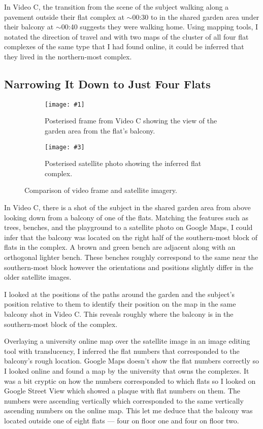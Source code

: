 \documentclass[a4paper,11pt]{report}
\newcommand{\comparison}[5] {
    \begin{figure}[htbp]
        \centering
        
        \begin{subfigure}[t]{0.45\textwidth}
            \centering
            \texttt{[image: \#1]}
            \caption{#2}
        \end{subfigure}
        \hfill
        \begin{subfigure}[t]{0.45\textwidth}
            \centering
            \texttt{[image: \#3]}
            \caption{#4}
        \end{subfigure}
    
        \caption{#5}
    \end{figure}
}
\begin{document}
In Video C, the transition from the scene of the subject walking along a pavement outside their flat complex at $\sim$00:30 to in the shared garden area under their balcony at $\sim$00:40 suggests they were walking home. Using mapping tools, I notated the direction of travel and with two maps of the cluster of all four flat complexes of the same type that I had found online, it could be inferred that they lived in the northern-most complex.

\subsection{Narrowing It Down to Just Four Flats}

\comparison
    {images/garden-balcony.png}
    {Posterised frame from Video C showing the view of the garden area from the flat's balcony.}
    {images/garden-satellite.png}
    {Posterised satellite photo showing the inferred flat complex.}
    {Comparison of video frame and satellite imagery.}

In Video C, there is a shot of the subject in the shared garden area from above looking down from a balcony of one of the flats. Matching the features such as trees, benches, and the playground to a satellite photo on Google Maps, I could infer that the balcony was located on the right half of the southern-most block of flats in the complex. A brown and green bench are adjacent along with an orthogonal lighter bench. These benches roughly correspond to the same near the southern-most block however the orientations and positions slightly differ in the older satellite images.

I looked at the positions of the paths around the garden and the subject's position relative to them to identify their position on the map in the same balcony shot in Video C. This reveals roughly where the balcony is in the southern-most block of the complex.

Overlaying a university online map over the satellite image in an image editing tool with translucency, I inferred the flat numbers that corresponded to the balcony's rough location. Google Maps doesn't show the flat numbers correctly so I looked online and found a map by the university that owns the complexes. It was a bit cryptic on how the numbers corresponded to which flats so I looked on Google Street View which showed a plaque with flat numbers on them. The numbers were ascending vertically which corresponded to the same vertically ascending numbers on the online map. This let me deduce that the balcony was located outside one of eight flats --- four on floor one and four on floor two.
\end{document}
